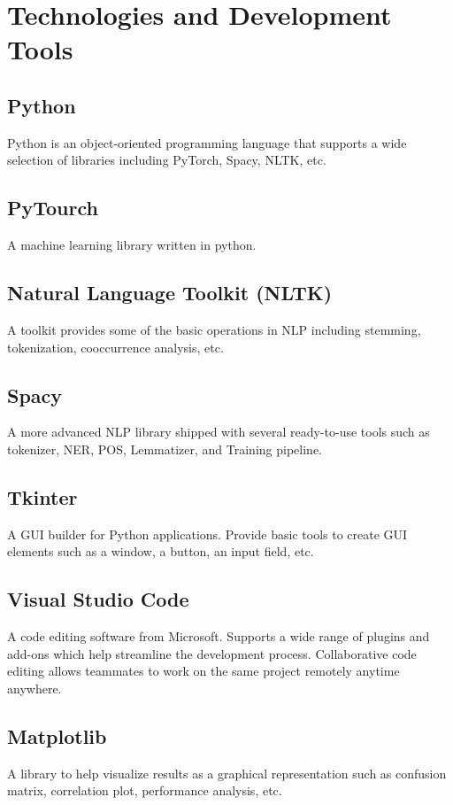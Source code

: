 \documentclass[12pt,oneside,openright,a4paper]{cpe-english-project}
\begin{document}
\section{Technologies and Development Tools}
\subsection{Python} 
Python is an object-oriented programming language that supports a wide selection of libraries including PyTorch, Spacy, NLTK, etc. 
 
\subsection{PyTourch} 
A machine learning library written in python.

\subsection{Natural Language Toolkit (NLTK)} 
A toolkit provides some of the basic operations in NLP including stemming, tokenization, cooccurrence analysis, etc. 

\subsection{Spacy} 
A more advanced NLP library shipped with several ready-to-use tools such as tokenizer, NER, POS, Lemmatizer, and Training pipeline.  

\subsection{Tkinter} 
A GUI builder for Python applications. Provide basic tools to create GUI elements such as a window, a button, an input field, etc. 

\subsection{Visual Studio Code} 
A code editing software from Microsoft. Supports a wide range of plugins and add-ons which help streamline the development process. Collaborative code editing allows teammates to work on the same project remotely anytime anywhere. 

\subsection{Matplotlib} 
A library to help visualize results as a graphical representation such as confusion matrix, correlation plot, performance analysis, etc. 
\end{document}
